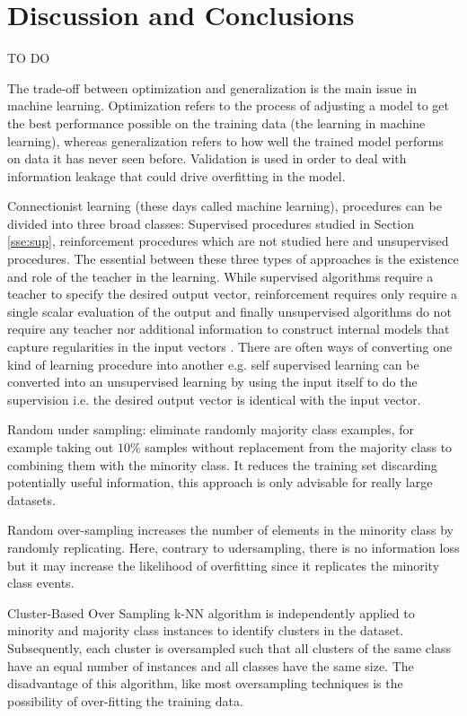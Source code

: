 \documentclass[11pt]{article}
\theoremstyle{definition}
\theoremstyle{remark}
\begin{document}
\section{Discussion and Conclusions}
\label{se:dis}
TO DO

The trade-off between optimization and generalization is the main issue in machine learning. Optimization refers to the process of adjusting a model to get the best performance possible on the training data (the learning in machine learning), whereas generalization refers to how well the trained model performs on data it has never seen before.
Validation is used in order to deal with information leakage that could drive overfitting in the model.


Connectionist learning (these days called machine learning), procedures can be divided into three broad classes: Supervised procedures studied in Section \ref{sse:sup}, reinforcement procedures which are not studied here and unsupervised procedures.
The essential between these three types of approaches is the existence and role of the teacher in the learning.
While supervised algorithms require a teacher to specify the desired output vector, reinforcement requires only require a single scalar evaluation of the output and finally unsupervised algorithms do not require any teacher nor additional information to  construct internal models that capture regularities in the input vectors  \cite{hinton1990connectionist}. There are often ways of converting one kind of learning procedure into another e.g. self supervised learning can be converted into an unsupervised learning by using the input itself to do the supervision i.e. the desired output vector is identical with the input vector.

Random under sampling: eliminate randomly majority class examples, for example taking out $10\%$ samples without replacement from the majority class to combining them with the minority class. It reduces the training set discarding potentially useful information, this approach is only advisable for really large datasets.

Random over-sampling increases the number of elements in the minority class by randomly replicating. Here, contrary to udersampling, there is no information loss but it may increase the likelihood of overfitting since it replicates the minority class events.

Cluster-Based Over Sampling k-NN algorithm is independently applied to minority and majority class instances to identify clusters in the dataset. Subsequently, each cluster is oversampled such that all clusters of the same class have an equal number of instances and all classes have the same size. The disadvantage of this algorithm, like most oversampling techniques is the possibility of over-fitting the training data.  
\end{document}
